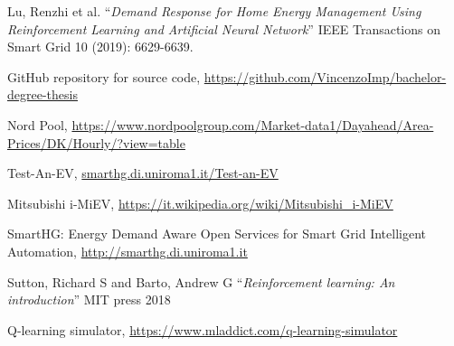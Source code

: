 \documentclass[italian, Lau, oneside]{sapthesis}
\begin{document}
\begin{thebibliography}{17}

Lu, Renzhi et al. “\textit{Demand Response for Home Energy Management Using Reinforcement Learning and Artificial Neural Network}” IEEE Transactions on Smart Grid 10 (2019): 6629-6639.

 GitHub repository for source code, \url{https://github.com/VincenzoImp/bachelor-degree-thesis}

 Nord Pool, \url{https://www.nordpoolgroup.com/Market-data1/Dayahead/Area-Prices/DK/Hourly/?view=table}

 Test-An-EV, \url{smarthg.di.uniroma1.it/Test-an-EV}

 Mitsubishi i-MiEV, \url{https://it.wikipedia.org/wiki/Mitsubishi_i-MiEV}

SmartHG: Energy Demand Aware Open Services for Smart Grid Intelligent Automation, \url{http://smarthg.di.uniroma1.it}

\bibitem{} Sutton, Richard S and Barto, Andrew G “\textit{Reinforcement learning: An introduction}” MIT press 2018


 Q-learning simulator, \url{https://www.mladdict.com/q-learning-simulator}






\end{thebibliography}
\end{document}
